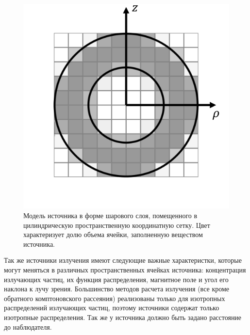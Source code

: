 \begin{figure}
	\centering
	\includegraphics[width=10.5 cm]{./fig/sphericalSource.png} 
	\caption{Модель источника в форме шарового слоя, помещенного в цилиндрическую пространственную координатную сетку. Цвет характеризует долю объема ячейки, заполненную веществом источника.}
	\label{sphericalLayer}
\end{figure}

Так же источники излучения имеют следующие важные характеристки, которые могут меняться в различных пространственных ячейках источника: концентрация излучающих частиц, их функция распределения, магнитное поле и угол его наклона к лучу зрения. Большинство методов расчета излучения (все кроме обратного комптоновского рассеяния) реализованы только для изотропных распределений излучающих частиц, поэтому источники содержат только изотропные распределения. Так же у источника должно быть задано расстояние до наблюдателя.

